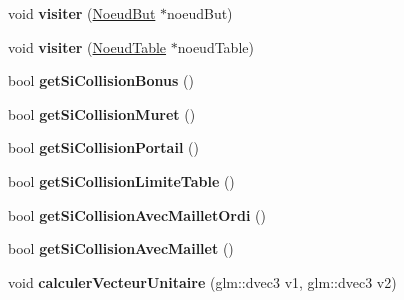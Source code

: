 \begin{DoxyCompactItemize}
\item 
void {\bfseries visiter} (\hyperlink{class_noeud_but}{Noeud\+But} $\ast$noeud\+But)\hypertarget{class_visiteur_collision_ac6e2b33a9ecaa2c4282ae76bcd78c8b3}{}\label{class_visiteur_collision_ac6e2b33a9ecaa2c4282ae76bcd78c8b3}

\item 
void {\bfseries visiter} (\hyperlink{class_noeud_table}{Noeud\+Table} $\ast$noeud\+Table)\hypertarget{class_visiteur_collision_a865b34179bc9ee2de7479cfe3ddb06c6}{}\label{class_visiteur_collision_a865b34179bc9ee2de7479cfe3ddb06c6}

\item 
bool {\bfseries get\+Si\+Collision\+Bonus} ()\hypertarget{class_visiteur_collision_aece7b62715319476da944d32aaf7e9cb}{}\label{class_visiteur_collision_aece7b62715319476da944d32aaf7e9cb}

\item 
bool {\bfseries get\+Si\+Collision\+Muret} ()\hypertarget{class_visiteur_collision_aade21e7e5660fee8f6bcc14e40d379ae}{}\label{class_visiteur_collision_aade21e7e5660fee8f6bcc14e40d379ae}

\item 
bool {\bfseries get\+Si\+Collision\+Portail} ()\hypertarget{class_visiteur_collision_a89606c827763de9ecfbc4d140205b093}{}\label{class_visiteur_collision_a89606c827763de9ecfbc4d140205b093}

\item 
bool {\bfseries get\+Si\+Collision\+Limite\+Table} ()\hypertarget{class_visiteur_collision_ae7e1c5727d4648fcfdf3db45c9f371d6}{}\label{class_visiteur_collision_ae7e1c5727d4648fcfdf3db45c9f371d6}

\item 
bool {\bfseries get\+Si\+Collision\+Avec\+Maillet\+Ordi} ()\hypertarget{class_visiteur_collision_a2e1845f6013a63f34ca5bcc079a8ddd5}{}\label{class_visiteur_collision_a2e1845f6013a63f34ca5bcc079a8ddd5}

\item 
bool {\bfseries get\+Si\+Collision\+Avec\+Maillet} ()\hypertarget{class_visiteur_collision_aa0e39efcdddf6458ebdcd2ba99616cf7}{}\label{class_visiteur_collision_aa0e39efcdddf6458ebdcd2ba99616cf7}

\item 
void {\bfseries calculer\+Vecteur\+Unitaire} (glm\+::dvec3 v1, glm\+::dvec3 v2)\hypertarget{class_visiteur_collision_a85b520122b7b0947937d2c0273b65cd4}{}\label{class_visiteur_collision_a85b520122b7b0947937d2c0273b65cd4}


\end{DoxyCompactItemize}
